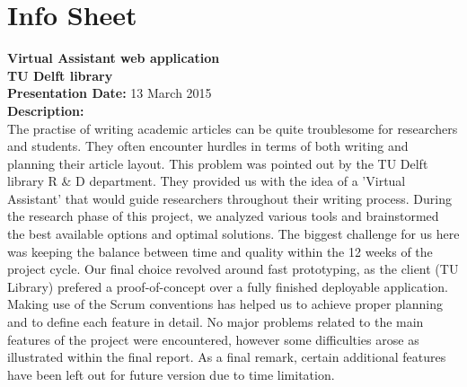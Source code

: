 \chapter{Info Sheet}    
\textbf{Virtual Assistant web application\\}
\textbf{\small{TU Delft library\\}}
\textbf{Presentation Date: } 13 March 2015\\ 
\bigskip
\textbf{Description: \\}
 The practise of writing academic articles can be quite troublesome for researchers and students. They often encounter hurdles in terms of both writing 
 and planning their article layout. This problem was pointed out by the TU Delft library R \& D department. They provided us with the idea of a 
 'Virtual Assistant' that would guide researchers throughout their writing process. During the research phase of this project, we analyzed various tools and brainstormed the best available options 
 and optimal solutions. The biggest challenge for us here was keeping the balance between time and quality within the 12 weeks of the project cycle. 
 Our final choice revolved around fast prototyping, as the client (TU Library) prefered a proof-of-concept over a fully finished deployable application. 
 Making use of the Scrum conventions has helped us to achieve proper planning and to define each feature in detail. No major problems related to the 
 main features of the project were encountered, however some difficulties arose as illustrated within the final report. As a final remark, certain 
 additional features have been left out for future version due to time limitation.\\

